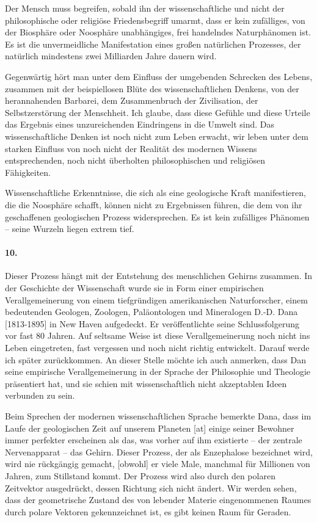 \documentclass[11pt,a4paper]{book}
\begin{document}
Der Mensch muss begreifen, sobald ihn der wissenschaftliche und nicht der
philosophische oder religiöse Friedensbegriff umarmt, dass er kein zufälliges,
von der Biosphäre oder Noosphäre unabhängiges, frei handelndes Naturphänomen
ist. Es ist die unvermeidliche Manifestation eines großen natürlichen
Prozesses, der natürlich mindestens zwei Milliarden Jahre dauern wird.

Gegenwärtig hört man unter dem Einfluss der umgebenden Schrecken des Lebens,
zusammen mit der beispiellosen Blüte des wissenschaftlichen Denkens, von der
herannahenden Barbarei, dem Zusammenbruch der Zivilisation, der
Selbstzerstörung der Menschheit. Ich glaube, dass diese Gefühle und diese
Urteile das Ergebnis eines unzureichenden Eindringens in die Umwelt sind. Das
wissenschaftliche Denken ist noch nicht zum Leben erwacht, wir leben unter dem
starken Einfluss von noch nicht der Realität des modernen Wissens
entsprechenden, noch nicht überholten philosophischen und religiösen
Fähigkeiten.

Wissenschaftliche Erkenntnisse, die sich als eine geologische Kraft
manifestieren, die die Noosphäre schafft, können nicht zu Ergebnissen führen,
die dem von ihr geschaffenen geologischen Prozess widersprechen. Es ist kein
zufälliges Phänomen -- seine Wurzeln liegen extrem tief.

\paragraph{10.}
Dieser Prozess hängt mit der Entstehung des menschlichen Gehirns zusammen. In
der Geschichte der Wissenschaft wurde sie in Form einer empirischen
Verallgemeinerung von einem tiefgründigen amerikanischen Naturforscher, einem
bedeutenden Geologen, Zoologen, Paläontologen und Mineralogen D.-D. Dana
[1813-1895] in New Haven aufgedeckt. Er veröffentlichte seine Schlussfolgerung
vor fast 80 Jahren. Auf seltsame Weise ist diese Verallgemeinerung noch nicht
ins Leben eingetreten, fast vergessen und noch nicht richtig
entwickelt. Darauf werde ich später zurückkommen. An dieser Stelle möchte ich
auch anmerken, dass Dan seine empirische Verallgemeinerung in der Sprache der
Philosophie und Theologie präsentiert hat, und sie schien mit wissenschaftlich
nicht akzeptablen Ideen verbunden zu sein.

Beim Sprechen der modernen wissenschaftlichen Sprache bemerkte Dana, dass im
Laufe der geologischen Zeit auf unserem Planeten [at] einige seiner Bewohner
immer perfekter erscheinen als das, was vorher auf ihm existierte -- der
zentrale Nervenapparat -- das Gehirn. Dieser Prozess, der als Enzephalose
bezeichnet wird, wird nie rückgängig gemacht, [obwohl] er viele Male, manchmal
für Millionen von Jahren, zum Stillstand kommt. Der Prozess wird also durch
den polaren Zeitvektor ausgedrückt, dessen Richtung sich nicht ändert. Wir
werden sehen, dass der geometrische Zustand des von lebender Materie
eingenommenen Raumes durch polare Vektoren gekennzeichnet ist, es gibt keinen
Raum für Geraden.
\end{document}
